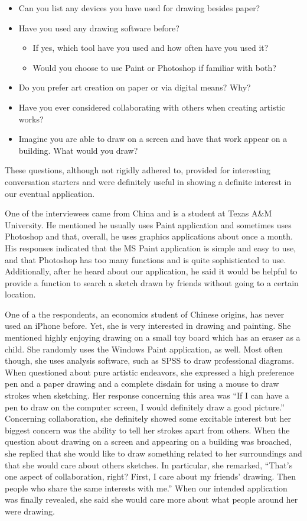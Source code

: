 \documentclass{chi2009}
\begin{document}
\begin{itemize}
\item Can you list any devices you have used for drawing besides paper?
\item Have you used any drawing software before?
	\begin{itemize}
	\item If yes, which tool have you used and how often have you used it?
	\item Would you choose to use Paint or Photoshop if familiar with both?
	\end{itemize}
\item Do you prefer art creation on paper or via digital means?  Why?
\item Have you ever considered collaborating with others when creating artistic works?
\item Imagine you are able to draw on a screen and have that work appear on a
	building.  What would you draw?
\end{itemize}

These questions, although not rigidly adhered to, provided for interesting
conversation starters and were definitely useful in showing a definite interest
in our eventual application.

One of the interviewees came from China and is a student at Texas A\&M
University.  He mentioned he usually uses Paint application and sometimes uses
Photoshop and that, overall, he uses graphics applications about once a month.
His responses indicated that the MS Paint application is simple and easy to
use, and that Photoshop has too many functions and is quite sophisticated to
use.  Additionally, after he heard about our application, he said it would be
helpful to provide a function to search a sketch drawn by friends without going
to a certain location.

One of a the respondents, an economics student of Chinese origins, has never used an
iPhone before.  Yet, she is very interested in drawing and painting.  She
mentioned highly enjoying drawing on a small toy board which has an eraser as
a child.  She randomly uses the Windows Paint application, as well.  Most often
though, she uses analysis software, such as SPSS to draw professional diagrams.
When questioned about pure artistic endeavors, she expressed a high preference
pen and a paper drawing and a complete disdain for using a mouse to draw strokes
when sketching. Her response concerning this area was ``If I can have a pen to
draw on the computer screen, I would definitely draw a good picture.''
Concerning collaboration, she definitely showed some excitable interest but her
biggest concern was the ability to tell her strokes apart from others.   When
the question about drawing on a screen and appearing on a building was
broached, she replied that she would like to draw something related to her
surroundings and that she would care about others sketches.  In particular, she
remarked, ``That's one aspect of collaboration, right? First, I care about my
friends' drawing. Then people who share the same interests with me.''
When our intended application was finally revealed, she said she would care
more about what people around her were drawing.
\end{document}
